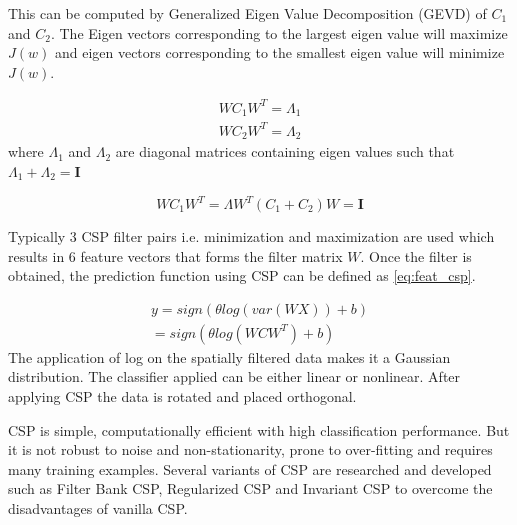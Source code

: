 This can be computed by Generalized Eigen Value Decomposition (GEVD) of $C_{1}$ and $C_{2}$. The Eigen vectors corresponding to the largest eigen value will maximize $J(w)$ and eigen vectors corresponding to the smallest eigen value will minimize $J(w)$. 

\begin{equation} \label{eq:def_csp}
    \begin{split}
        WC_{1}W^T = \Lambda_{1}\\
        WC_{2}W^T = \Lambda_{2}
    \end{split}
\end{equation}
where  $\Lambda_{1}$ and  $\Lambda_{2}$ are diagonal matrices containing eigen values such that $\Lambda_{1} + \Lambda_{2} = \mathbf{I}$

\begin{equation} \label{eq:def_gevd}
    WC_{1}W^T = \Lambda W^T(C_{1} + C_{2})W = \mathbf{I}
\end{equation}

Typically 3 CSP filter pairs i.e. minimization and maximization are used which results in 6 feature vectors that forms the filter matrix $W$. Once the filter is obtained, the prediction function using CSP can be defined as \ref{eq:feat_csp}.

\begin{equation} \label{eq:feat_csp}
    \begin{split}
    y = sign(\theta log(var(WX)) +b) \\
        = sign(\theta log(WCW^T) + b)
    \end{split}
\end{equation}
The application of log on the spatially filtered data makes it a Gaussian distribution. The classifier applied can be either linear or nonlinear. After applying CSP the data is rotated and placed orthogonal.

CSP is simple, computationally efficient with high classification performance. But it is not robust to noise and non-stationarity, prone to over-fitting and requires many training examples. Several variants of CSP are researched and developed such as Filter Bank CSP, Regularized CSP and Invariant CSP to overcome the disadvantages of vanilla CSP.


